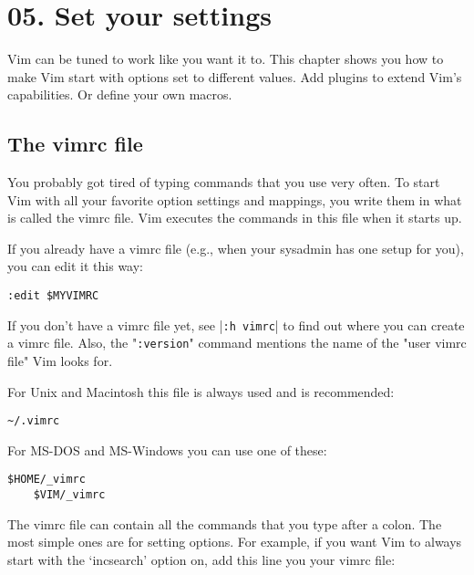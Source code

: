 \section{05. Set your settings}
Vim can be tuned to work like you want it to.  This chapter shows you how to
make Vim start with options set to different values.  Add plugins to extend
Vim's capabilities.  Or define your own macros.
\localtableofcontents
\subsection{The vimrc file}
\label{The vimrc file}
\label{vimrc-intro}

You probably got tired of typing commands that you use very often.
To start Vim with all your favorite option settings and mappings, you write them in what is called the vimrc file.
Vim executes the commands in this file when it starts up.

If you already have a vimrc file (e.g., when your sysadmin has one setup for you), you can edit it this way:

 \begin{Verbatim}[samepage=true]
 :edit $MYVIMRC
 \end{Verbatim}

If you don't have a vimrc file yet, see |\texttt{:h vimrc}| to find out where you can create a vimrc file.
Also, the "\texttt{:version}" command mentions the name of the "user vimrc file" Vim looks for.

For Unix and Macintosh this file is always used and is recommended:

\begin{Verbatim}[samepage=true]
    ~/.vimrc
\end{Verbatim}

For MS-DOS and MS-Windows you can use one of these:

\begin{Verbatim}[samepage=true]
    $HOME/_vimrc
    $VIM/_vimrc
\end{Verbatim}

The vimrc file can contain all the commands that you type after a colon.
The most simple ones are for setting options.
For example, if you want Vim to always start with the `incsearch' option on, add this line you your vimrc file:

